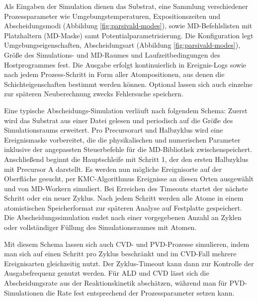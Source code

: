 Als Eingaben der Simulation dienen das Substrat, eine Sammlung verschiedener Prozessparameter wie Umgebungstemperaturen, Expositionszeiten und Abscheidungsmodi (Abbildung \ref{fig:parsivald-modes}), sowie MD-Befehlslisten mit Platzhaltern (MD-Maske) samt Potentialparametrisierung.
Die Konfiguration legt Umgebungseigenschaften, Abscheidungsart (Abbildung \ref{fig:parsivald-modes}), Größe des Simulations- und MD-Raumes und Laufzeitbedingungen des Hostprogrammes fest.
Die Ausgabe erfolgt kontinuierlich in Ereignis-Logs sowie nach jedem Prozess-Schritt in Form aller Atompositionen, aus denen die Schichteigenschaften bestimmt werden können.
Optional lassen sich auch einzelne zur späteren Neuberechnung zwecks Fehlersuche speichern.

Eine typische Abscheidungs-Simulation verläuft nach folgendem Schema:
Zuerst wird das Substrat aus einer Datei gelesen und periodisch auf die Größe des Simulationsraums erweitert.
Pro Precursorart und Halbzyklus wird eine Ereignismaske vorbereitet, die die physikalischen und numerischen Parameter inklusive der angepassten Steuerbefehle für die MD-Bibliothek zwischenspeichert.
Anschließend beginnt die Hauptschleife mit Schritt 1, der den ersten Halbzyklus mit Precursor A darstellt.
Es werden nun mögliche Ereignisorte auf der Oberfläche gesucht, per KMC-Algorithmus Ereignisse an diesen Orten ausgewählt und von MD-Workern simuliert.
Bei Erreichen des Timeouts startet der nächste Schritt oder ein neuer Zyklus.
Nach jedem Schritt werden alle Atome in einem atomistischen Speicherformat zur späteren Analyse auf Festplatte gespeichert.
Die Abscheidungssimulation endet nach einer vorgegebenen Anzahl an Zyklen oder vollständiger Füllung des Simulationsraumes mit Atomen.

Mit diesem Schema lassen sich auch CVD- und PVD-Prozesse simulieren, indem man sich auf einen Schritt pro Zyklus beschränkt und im CVD-Fall mehrere Ereignisarten gleichzeitig nutzt.
Der Zyklus-Timeout kann dann zur Kontrolle der Ausgabefrequenz genutzt werden.
Für ALD und CVD lässt sich die Abscheidungsrate aus der Reaktionskinetik abschätzen, während man für PVD-Simulationen die Rate fest entsprechend der Prozessparameter setzen kann.

